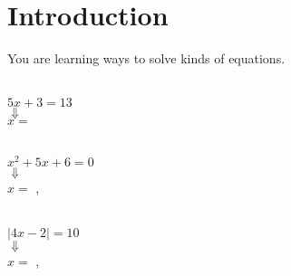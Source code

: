 \section{Introduction}

You are learning  ways to solve  kinds of equations.

\vspace{1\onelineskip}

\begin{tcbraster}[
    raster equal height, 
    raster columns = 3,
    raster column skip = 0.5in,
]
    \begin{tcolorbox}[colback=white,boxrule=0.5pt,]
        \raggedright
        \begin{center}
            {\large{}}\\[0.5\onelineskip]
            $5x +3 = 13$\\[0.25\baselineskip]
            {\huge$\Downarrow$}\\
            $x =$ 
        \end{center}
    \end{tcolorbox}
    \begin{tcolorbox}[colback=white,boxrule=0.5pt,]
        \raggedright
        \begin{center}
            {\large{}}\\[0.5\onelineskip]
            $x^2 + 5x + 6 = 0$\\[0.25\baselineskip]
            {\huge$\Downarrow$}\\[0.2\baselineskip]
            $x =$ , 
        \end{center}
    \end{tcolorbox}
    \begin{tcolorbox}[colback=white,boxrule=3pt,]
        \raggedright
        \begin{center}
            {\large{}}\\[0.5\onelineskip]
            $|4x -2 | = 10$\\[0.25\baselineskip]
            {\huge$\Downarrow$}\\[0.2\baselineskip]
            $x =$ , 
        \end{center}
    \end{tcolorbox}
\end{tcbraster}

